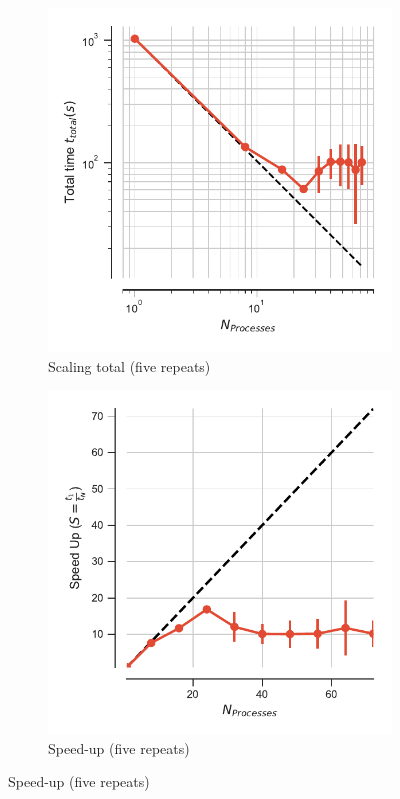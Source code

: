 \begin{figure}
\centering
\begin{subfigure}{.4\textwidth}
  \includegraphics[width=\linewidth]{figures/main-RMSD-t_total.pdf}
  \caption{Scaling total (five repeats)}
  \label{fig:MPIscaling}
\end{subfigure}
\hfill
\begin{subfigure}{.4\textwidth}
  \includegraphics[width=\linewidth]{figures/main-RMSD-speed_up.pdf}
  \caption{Speed-up (five repeats)}
  \label{fig:MPIspeedup}
\end{subfigure}
\bigskip


\end{figure}
